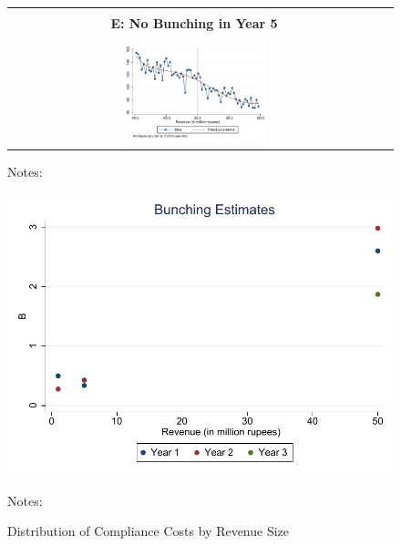 \begin{figure}[t]
\begin{centering}
\begin{tabular}{cc}
\vspace{0.2cm}
  & \tabularnewline
\textbf{E: No Bunching in Year 5}  & \tabularnewline
\includegraphics[width=0.4\textwidth]{graphs/BunchingYear4_50Million_Degree4_3lac}  & \tabularnewline
\end{tabular}
\par\end{centering}
{\footnotesize{}{}{}Notes: }{\footnotesize \par}
\end{figure}

\newpage{}

\begin{figure}[t]
\caption{Distribution of Compliance Costs by Revenue Size}

\label{fig:ComplianceCosts}\vspace{0.2cm}

\begin{centering}
\includegraphics[width=1\textwidth]{graphs/BunchingEstimates} 
\par\end{centering}
{\footnotesize{}{}{}Notes: }{\footnotesize \par}
\end{figure}
